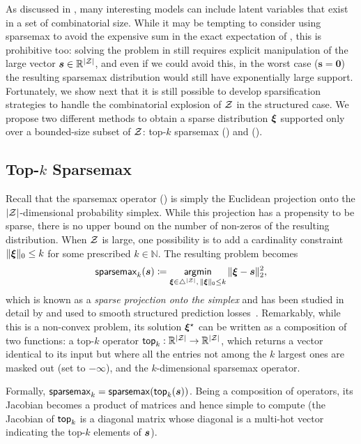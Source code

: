 As discussed in , many interesting models
can include latent variables that exist in a set of combinatorial
size. While it may be tempting to consider using sparsemax to avoid
the expensive sum in the exact expectation of , this
is prohibitive too: solving the problem in 
still requires explicit manipulation of the large vector $\bm{s} \in
    \mathbb{R}^{|\mathcal{Z}|}$, and even if we could avoid this, in the worst
case ($\bm{s}=\bm{0}$) the resulting sparsemax distribution would
still have exponentially large support. Fortunately, we show next
that it is still possible to develop sparsification strategies to
handle the combinatorial explosion of $\mathcal{Z}$ in the structured case.
We propose two different methods to obtain a sparse distribution
$\bm{\xi}$ supported only over a bounded-size subset of $\mathcal{Z}$: top-$k$
sparsemax () and \smap ().

\subsection{\label{sec:topksparse}\texorpdfstring{Top-{\boldmath $k$}}{Top-k} Sparsemax}

Recall that the sparsemax operator () is simply
the Euclidean projection onto the $|\mathcal{Z}|$-dimensional probability
simplex. While this projection has a propensity to be sparse, there
is no upper bound on the number of non-zeros of the resulting
distribution. When $\mathcal{Z}$ is large, one possibility is to add a
cardinality constraint $\|\bm{\xi}\|_0 \le k$ for some prescribed $k \in
    \mathbb{N}$. The resulting problem becomes
\begin{equation}\label{eq:topk_sparsemax}
    \operatorname{\mathsf{sparsemax}_\text{$k$}}(\bm{s}) \coloneqq
    \operatorname*{\mathsf{argmin}}_{\bm{\xi} \in \triangle^{|\mathcal{Z}|}, \, \|\bm{\xi}\|_0 \le k} \| \bm{\xi} - \bm{s} \|_2^2,
\end{equation}
which is known as a \emph{sparse projection onto the simplex} and has
been studied in detail by \citet{kyrillidis2013sparse} and used to
smooth structured prediction
losses~\citep{NIPS2018_7726,blondel2020}. Remarkably, while this is a
non-convex problem, its solution $\bm{\xi}^\star$ can be written as a
composition of two functions: a top-$k$ operator $\operatorname{\mathsf{top}_\text{$k$}}:
    \mathbb{R}^{|\mathcal{Z}|} \rightarrow \mathbb{R}^{|\mathcal{Z}|}$, which returns a
vector identical to its input but where all the entries not among the
$k$ largest ones are masked out (set to $-\infty$), and the
$k$-dimensional sparsemax operator.

Formally, $\operatorname{\mathsf{sparsemax}_\text{$k$}} = \operatorname*{\mathsf{sparsemax}}(\operatorname{\mathsf{top}_\text{$k$}}(\bm{s}))$. Being a composition
of operators, its Jacobian becomes a product of matrices and hence
simple to compute (the Jacobian of $\operatorname{\mathsf{top}_\text{$k$}}$ is a diagonal matrix whose
diagonal is a multi-hot vector indicating the top-$k$ elements of
$\bm{s}$).

